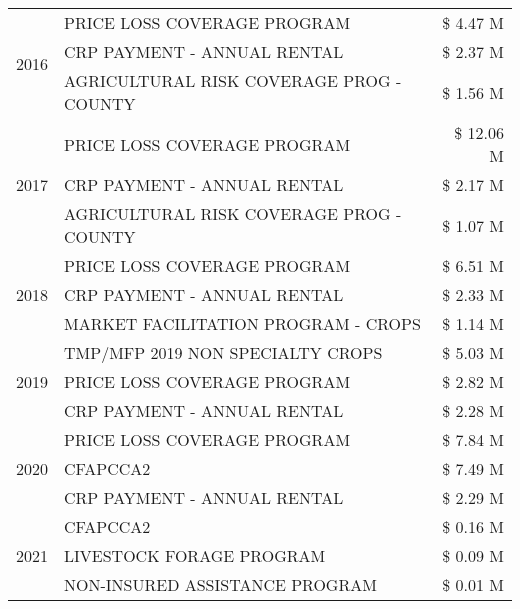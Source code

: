\begin{tabular}{llr}
\multirow[t]{3}{*}{2016} & PRICE LOSS COVERAGE PROGRAM & \$ 4.47 M \\
 & CRP PAYMENT - ANNUAL RENTAL & \$ 2.37 M \\
 & AGRICULTURAL RISK COVERAGE PROG - COUNTY & \$ 1.56 M \\
\cline{1-3}
\multirow[t]{3}{*}{2017} & PRICE LOSS COVERAGE PROGRAM & \$ 12.06 M \\
 & CRP PAYMENT - ANNUAL RENTAL & \$ 2.17 M \\
 & AGRICULTURAL RISK COVERAGE PROG - COUNTY & \$ 1.07 M \\
\cline{1-3}
\multirow[t]{3}{*}{2018} & PRICE LOSS COVERAGE PROGRAM & \$ 6.51 M \\
 & CRP PAYMENT - ANNUAL RENTAL & \$ 2.33 M \\
 & MARKET FACILITATION PROGRAM - CROPS & \$ 1.14 M \\
\cline{1-3}
\multirow[t]{3}{*}{2019} & TMP/MFP 2019 NON SPECIALTY CROPS & \$ 5.03 M \\
 & PRICE LOSS COVERAGE PROGRAM & \$ 2.82 M \\
 & CRP PAYMENT - ANNUAL RENTAL & \$ 2.28 M \\
\cline{1-3}
\multirow[t]{3}{*}{2020} & PRICE LOSS COVERAGE PROGRAM & \$ 7.84 M \\
 & CFAPCCA2 & \$ 7.49 M \\
 & CRP PAYMENT - ANNUAL RENTAL & \$ 2.29 M \\
\cline{1-3}
\multirow[t]{3}{*}{2021} & CFAPCCA2 & \$ 0.16 M \\
 & LIVESTOCK FORAGE PROGRAM & \$ 0.09 M \\
 & NON-INSURED ASSISTANCE PROGRAM & \$ 0.01 M \\
\cline{1-3}
\bottomrule
\end{tabular}
